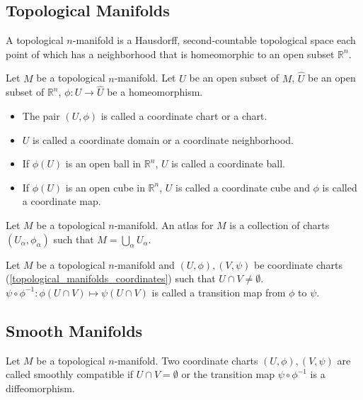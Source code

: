 \subsection{Topological Manifolds}

\begin{defn}
  A topological $n$-manifold is a Hausdorff, second-countable topological space each point of which has a neighborhood that is homeomorphic to an open subset $\mathbb{R}^n$.
\end{defn}

\begin{defn}[Coordinates]\label{topological_manifolds_coordinates}
  Let $M$ be a topological $n$-manifold.
  Let $U$ be an open subset of $M$, $\hat{U}$ be an open subset of $\mathbb{R}^n$, $\phi: U \rightarrow \hat{U}$ be a homeomorphism.
  \begin{itemize}
    \item
      The pair $(U, \phi)$ is called a coordinate chart or a chart.
    \item
      $U$ is called a coordinate domain or a coordinate neighborhood.
    \item
      If $\phi(U)$ is an open ball in $\mathbb{R}^n$, $U$ is called a coordinate ball.
    \item
      If $\phi(U)$ is an open cube in $\mathbb{R}^n$, $U$ is called a coordinate cube and $\phi$ is called a coordinate map.
  \end{itemize}
\end{defn}

\begin{defn}[Atlas]
  Let $M$ be a topological $n$-manifold.
  An atlas for $M$ is a collection of charts $(U_{\alpha}, \phi_{\alpha})$ such that $M = \bigcup_{\alpha} U_{\alpha}$.
\end{defn}

\begin{defn}
  Let $M$ be a topological $n$-manifold and $(U, \phi), (V, \psi)$ be coordinate charts (\ref{topological_manifolds_coordinates}) such that $U \cap V \ne \emptyset$.
  $\psi \circ \phi^{-1}: \phi(U \cap V) \mapsto \psi(U \cap V)$ is called a transition map from $\phi$ to $\psi$.
\end{defn}

\subsection{Smooth Manifolds}

\begin{defn}
  Let $M$ be a topological $n$-manifold.
  Two coordinate charts $(U, \phi), (V, \psi)$ are called smoothly compatible if $U \cap V = \emptyset$ or the transition map $\psi \circ \phi^{-1}$ is a diffeomorphism.
\end{defn}
